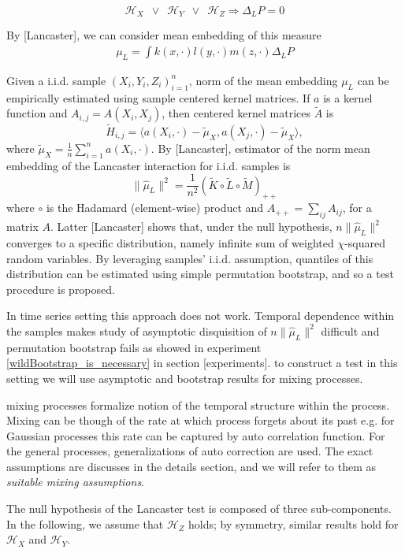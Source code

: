 \documentclass[]{article}
\begin{document}
\[\mathcal{H}_X \enspace \lor \enspace \mathcal{H}_Y \enspace \lor \enspace \mathcal{H}_Z \Rightarrow \Delta_LP=0 \]

By [Lancaster], we can consider mean embedding of this measure 
\begin{align}
 \mu_L = \int k(x,\cdot) l(y,\cdot) m(z,\cdot) \Delta_LP 
\end{align}


Given a i.i.d. sample $(X_i,Y_i,Z_i)_{i=1}^n$,  norm of the mean embedding $\mu_L$ can be empirically estimated using sample centered kernel matrices. If $a$ is a kernel function and $A_{i,j} = A(X_i,X_j)$, then centered kernel matrices  $\tilde{A}$ is 
\[
\tilde{H}_{i,j} = \langle a(X_i,\cdot)-\tilde{\mu}_X, a(X_j,\cdot) -\tilde{\mu}_X \rangle,
\]
where $\tilde{\mu}_X = \frac{1}{n}\sum_{i=1}^n a(X_i,\cdot)$.  By [Lancaster], estimator of the norm  mean embedding of the Lancaster interaction for i.i.d. samples is 
\begin{equation}\label{eqn:lancaster}
\|\hat \mu_L\|^2 = \frac{1}{n^2}\left(\tilde{K}\circ\tilde{L}\circ\tilde{M}\right)_{++}
\end{equation}
where $\circ$ is the Hadamard (element-wise) product and $A_{++} = \sum_{ij}A_{ij}$, for a matrix $A$. Latter [Lancaster] shows that, under the null hypothesis, $n \|\hat \mu_L\|^2 $ converges to a specific distribution, namely infinite sum of weighted $\chi$-squared random variables. By leveraging  samples' i.i.d. assumption, quantiles of this  distribution  can be estimated using simple permutation bootstrap, and so a test procedure is proposed.

In time series setting this approach does not work. Temporal dependence within the samples makes  study of asymptotic disquisition of $n \|\hat \mu_L\|^2 $ difficult  and permutation bootstrap fails as showed in experiment \ref{wildBootstrap_is_necessary} in section [experiments]. to construct a test in this setting we will use asymptotic and bootstrap results for mixing processes. 

mixing processes formalize notion of the temporal structure within the process. Mixing can be though of the rate at which process forgets about its past e.g. for Gaussian processes this rate can be captured by auto correlation function. For the general processes, generalizations of auto correction are used. The exact assumptions are discusses in the details section, and we will refer to them as \textit{suitable mixing assumptions}.   

The null hypothesis of the Lancaster test is composed of three sub-components. In the following, we assume that $\mathcal{H}_Z$ holds; by symmetry, similar results hold for $\mathcal{H}_X$ and $\mathcal{H}_Y$.
\end{document}
